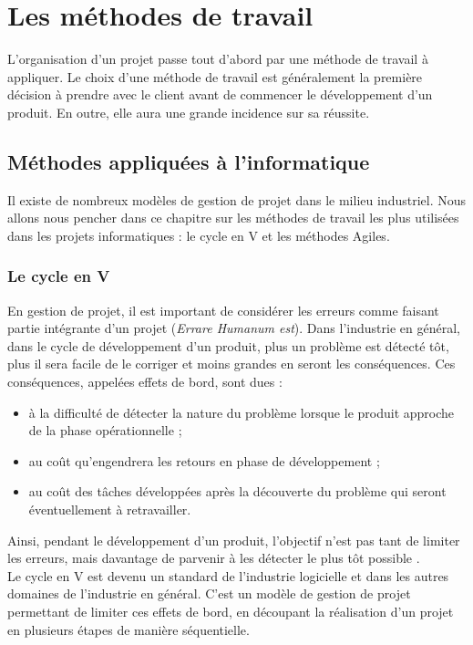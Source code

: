 \chapter{Les méthodes de travail}

L'organisation d'un projet passe tout d'abord par une méthode de travail à appliquer. Le choix d'une méthode de travail est généralement la première décision à prendre avec le client avant de commencer le développement d'un produit. En outre, elle aura une grande incidence sur sa réussite.

\section{Méthodes appliquées à l'informatique}

Il existe de nombreux modèles de gestion de projet dans le milieu industriel. Nous allons nous pencher dans ce chapitre sur les méthodes de travail les plus utilisées dans les projets informatiques : le cycle en V et les méthodes Agiles.

\subsection{Le cycle en V}

En gestion de projet, il est important de considérer les erreurs comme faisant partie intégrante d'un projet (\textit{Errare Humanum est}). Dans l'industrie en général, dans le cycle de développement d'un produit, plus un problème est détecté tôt, plus il sera facile de le corriger et moins grandes en seront les conséquences. Ces conséquences, appelées effets de bord, sont dues :

\begin{itemize}
\item à la difficulté de détecter la nature du problème lorsque le produit approche de la phase opérationnelle ;
\item au coût qu'engendrera les retours en phase de développement ;
\item au coût des tâches développées après la découverte du problème qui seront éventuellement à retravailler.
\end{itemize}

Ainsi, pendant le développement d'un produit, l'objectif n'est pas tant de limiter les erreurs, mais davantage de parvenir à les détecter le plus tôt possible .\\

Le cycle en V est devenu un standard de l'industrie logicielle et dans les autres domaines de l'industrie en général. C'est un modèle de gestion de projet permettant de limiter ces effets de bord, en découpant la réalisation d'un projet en plusieurs étapes de manière séquentielle.

